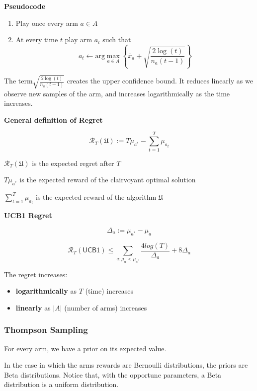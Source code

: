 \documentclass[10pt,a4paper]{article}
\begin{document}
\textbf{Pseudocode}

\begin{enumerate}
\item Play once every arm $a \in A$
\item At every time $t$ play arm $a_t$ such that
$$a_t \leftarrow \text{arg} \max_{a \in A}{\left\{ \bar{x}_a + \sqrt{\frac{2 \log(t)}{n_a (t-1)}} \right\}}$$
\end{enumerate}

The term$\sqrt{\frac{2 \log(t)}{n_a (t-1)}}$ creates the upper confidence bound. It reduces linearly as we observe new samples of the arm, and increases logarithmically as the time increases.
\newline

\textbf{General definition of Regret}

$$\mathscr{R}_{T}(\mathfrak{U}) := T\mu_{a^*} - \sum_{t=1}^{T}{\mu_{a_t}}$$

$\mathscr{R}_{T}(\mathfrak{U})$ is the expected regret after $T$

$T\mu_{a^*}$ is the expected reward of the clairvoyant optimal solution

$\sum_{t=1}^{T}{\mu_{a_t}}$ is the expected reward of the algorithm $\mathfrak{U}$
\newline

\textbf{UCB1 Regret}

$$\Delta_{a} := \mu_{a^*} - \mu_{a}$$

$$\mathscr{R}_{T} (\mathsf{UCB1}) \leq \sum_{a: \mu_{a} < \mu_{a^{*}}} \frac{4 log(T)}{\Delta_{a}} + 8 \Delta_{a}$$

The regret increases:

\begin{itemize}
\item \textbf{logarithmically} as $T$ (time) increases
\item \textbf{linearly} as $|A|$ (number of arms) increases
\end{itemize}

\subsubsection{Thompson Sampling}\label{thompson-sampling}

For every arm, we have a prior on its expected value.

In the case in which the arms rewards are Bernoulli distributions, the priors are Beta distributions. Notice that, with the opportune parameters, a Beta distribution is a uniform distribution.
\end{document}
